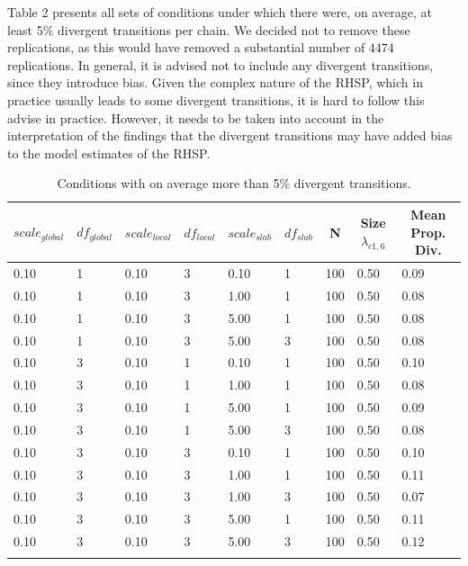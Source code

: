 \documentclass[
  man, donotrepeattitle,floatsintext]{apa6}
\begin{document}
Table 2 presents all sets of conditions under which there were, on average, at least 5\% divergent transitions per chain. We decided not to remove these replications, as this would have removed a substantial number of 4474 replications. In general, it is advised not to include any divergent transitions, since they introduce bias. Given the complex nature of the RHSP, which in practice usually leads to some divergent transitions, it is hard to follow this advise in practice. However, it needs to be taken into account in the interpretation of the findings that the divergent transitions may have added bias to the model estimates of the RHSP.

\begin{table}[tbp]

\begin{center}
\begin{threeparttable}

\caption{\label{tab:unnamed-chunk-3}Conditions with on average more than 5\% divergent transitions.}

\begin{tabular}{lllllllll}
\toprule
$scale_{global}$ & \multicolumn{1}{c}{$df_{global}$} & \multicolumn{1}{c}{$scale_{local}$} & \multicolumn{1}{c}{$df_{local}$} & \multicolumn{1}{c}{$scale_{slab}$} & \multicolumn{1}{c}{$df_{slab}$} & \multicolumn{1}{c}{N} & \multicolumn{1}{c}{Size $\lambda_{c1 , 6}$} & \multicolumn{1}{c}{Mean Prop. Div.}\\
\midrule
0.10 & 1 & 0.10 & 3 & 0.10 & 1 & 100 & 0.50 & 0.09\\
0.10 & 1 & 0.10 & 3 & 1.00 & 1 & 100 & 0.50 & 0.08\\
0.10 & 1 & 0.10 & 3 & 5.00 & 1 & 100 & 0.50 & 0.08\\
0.10 & 1 & 0.10 & 3 & 5.00 & 3 & 100 & 0.50 & 0.08\\
0.10 & 3 & 0.10 & 1 & 0.10 & 1 & 100 & 0.50 & 0.10\\
0.10 & 3 & 0.10 & 1 & 1.00 & 1 & 100 & 0.50 & 0.08\\
0.10 & 3 & 0.10 & 1 & 5.00 & 1 & 100 & 0.50 & 0.09\\
0.10 & 3 & 0.10 & 1 & 5.00 & 3 & 100 & 0.50 & 0.08\\
0.10 & 3 & 0.10 & 3 & 0.10 & 1 & 100 & 0.50 & 0.10\\
0.10 & 3 & 0.10 & 3 & 1.00 & 1 & 100 & 0.50 & 0.11\\
0.10 & 3 & 0.10 & 3 & 1.00 & 3 & 100 & 0.50 & 0.07\\
0.10 & 3 & 0.10 & 3 & 5.00 & 1 & 100 & 0.50 & 0.11\\
0.10 & 3 & 0.10 & 3 & 5.00 & 3 & 100 & 0.50 & 0.12\\
\bottomrule
\addlinespace
\end{tabular}


\end{threeparttable}
\end{center}
\end{table}
\end{document}
